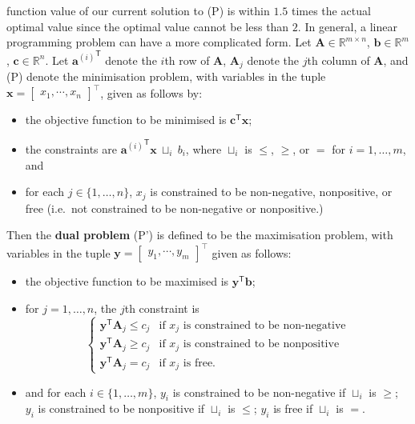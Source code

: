 function value of our current solution to (P) is within \(1.5\) times the
actual optimal value since the optimal value cannot be less than \(2\).
\newl In general, a linear programming problem can have a more complicated
form. Let \(\mathbf{A} \in \mathbb{R}^{m\times n}\),
\(\mathbf{b} \in \mathbb{R}^m\), \(\mathbf{c} \in \mathbb{R}^n\). Let
\({\mathbf{a}^{(i)}}^\mathsf{T}\) denote the \(i\)th row of
\(\mathbf{A}\), \(\mathbf{A}_j\) denote the \(j\)th column of
\(\mathbf{A}\), and (P) denote the minimisation problem, with variables in the tuple
\(\mathbf{x} = \begin{bmatrix} x_1, \cdots,  x_n\end{bmatrix}^{\!\top}\), given as follows
by:
\begin{itemize}[noitemsep]
\item
  the objective function to be minimised is
  \(\mathbf{c}^\mathsf{T} \mathbf{x}\);
\item
  the constraints are ${\mathbf{a}^{(i)}}^\mathsf{T}\mathbf{x}~\sqcup_i~b_i$, where \(\sqcup_i\) is \(\leq\), \(\geq\), or \(=\) for
  \(i = 1,\ldots, m\), and 
\item
  for each \(j \in \{1,\ldots,n\}\), \(x_j\) is constrained to be
  non-negative, nonpositive, or free (i.e.~not constrained to be
  non-negative or nonpositive.)
\end{itemize}
Then the \textbf{dual problem} (P') is defined to be the maximisation problem,
with variables in the tuple
\(\mathbf{y} = \begin{bmatrix} y_1, \cdots, y_m\end{bmatrix}^{\!\top}\) given
as follows:
\begin{itemize}[noitemsep]
\item
  the objective function to be maximised is
  \(\mathbf{y}^\mathsf{T} \mathbf{b}\);
\item
  for \(j = 1,\ldots, n\), the \(j\)th constraint is \begin{equation*}
  \left \{\begin{array}{ll}
  \mathbf{y}^\mathsf{T}\mathbf{A}_j \leq c_j & \text{if } x_j \text{ is
  constrained to be non-negative} \\
  \mathbf{y}^\mathsf{T}\mathbf{A}_j \geq c_j & \text{if } x_j \text{ is
  constrained to be nonpositive} \\
  \mathbf{y}^\mathsf{T}\mathbf{A}_j = c_j & \text{if } x_j \text{ is free}.
  \end{array}\right.
  \end{equation*}
\item
  and for each \(i \in \{1,\ldots,m\}\), \(y_i\) is constrained to be
  non-negative if \(\sqcup_i\) is \(\geq\); \(y_i\) is constrained to be
  nonpositive if \(\sqcup_i\) is \(\leq\); \(y_i\) is free if
  \(\sqcup_i\) is \(=\).
\end{itemize}
